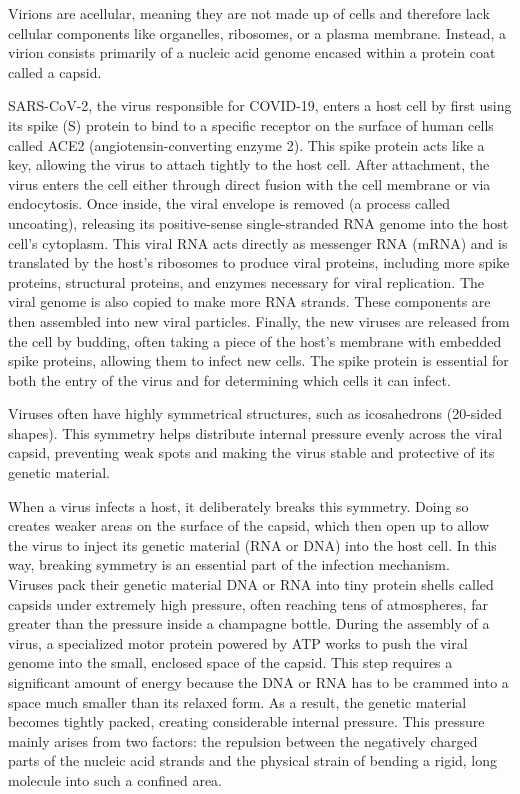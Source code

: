 \documentclass[12pt]{article}
\begin{document}
\begin{flushleft}
Virions are acellular, meaning they are not made up of cells and therefore lack cellular components like organelles, ribosomes, or a plasma membrane. Instead, a virion consists primarily of a nucleic acid genome encased within a protein coat called a capsid. 




SARS-CoV-2, the virus responsible for COVID-19, enters a host cell by first using its spike (S) protein to bind to a specific receptor on the surface of human cells called ACE2 (angiotensin-converting enzyme 2). This spike protein acts like a key, allowing the virus to attach tightly to the host cell. After attachment, the virus enters the cell either through direct fusion with the cell membrane or via endocytosis. Once inside, the viral envelope is removed (a process called uncoating), releasing its positive-sense single-stranded RNA genome into the host cell’s cytoplasm. This viral RNA acts directly as messenger RNA (mRNA) and is translated by the host's ribosomes to produce viral proteins, including more spike proteins, structural proteins, and enzymes necessary for viral replication. The viral genome is also copied to make more RNA strands. These components are then assembled into new viral particles. Finally, the new viruses are released from the cell by budding, often taking a piece of the host’s membrane with embedded spike proteins, allowing them to infect new cells. The spike protein is essential for both the entry of the virus and for determining which cells it can infect.

Viruses often have highly symmetrical structures, such as icosahedrons (20-sided shapes). This symmetry helps distribute internal pressure evenly across the viral capsid, preventing weak spots and making the virus stable and protective of its genetic material.

When a virus infects a host, it deliberately breaks this symmetry. Doing so creates weaker areas on the surface of the capsid, which then open up to allow the virus to inject its genetic material (RNA or DNA) into the host cell. In this way, breaking symmetry is an essential part of the infection mechanism.\\




Viruses pack their genetic material DNA or RNA into tiny protein shells called capsids under extremely high pressure, often reaching tens of atmospheres, far greater than the pressure inside a champagne bottle. During the assembly of a virus, a specialized motor protein powered by ATP works to push the viral genome into the small, enclosed space of the capsid. This step requires a significant amount of energy because the DNA or RNA has to be crammed into a space much smaller than its relaxed form. As a result, the genetic material becomes tightly packed, creating considerable internal pressure. This pressure mainly arises from two factors: the repulsion between the negatively charged parts of the nucleic acid strands and the physical strain of bending a rigid, long molecule into such a confined area.\cite{BrandarizNunez2019}





\end{flushleft}
\end{document}
